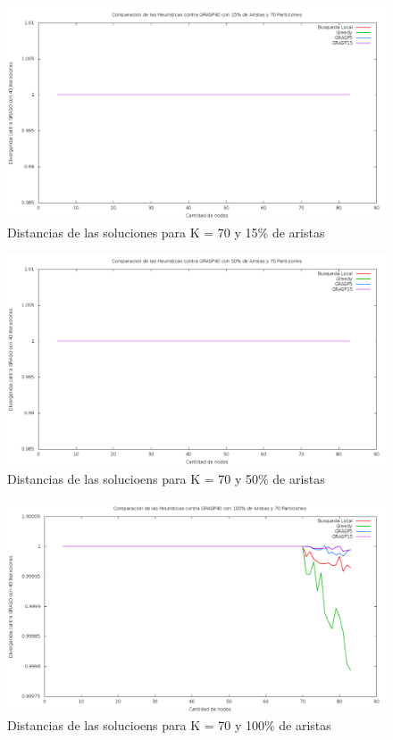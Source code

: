 \begin{figure}[H]
\begin{center}
\includegraphics[scale=0.3]{finales/muchosComparacionesCon70Particiones15Aristas.png}
\caption{Distancias de las soluciones para K = 70 y 15\% de aristas}
\end{center}
\end{figure}

\begin{figure}[H]
\begin{center}
\includegraphics[scale=0.3]{finales/muchosComparacionesCon70Particiones50Aristas.png}
\caption{Distancias de las solucioens para K = 70 y 50\% de aristas}
\end{center}
\end{figure}

\begin{figure}[H]
\begin{center}
\includegraphics[scale=0.3]{finales/muchosComparacionesCon70Particiones100Aristas.png}
\caption{Distancias de las solucioens para K = 70 y 100\% de aristas}
\end{center}
\end{figure}